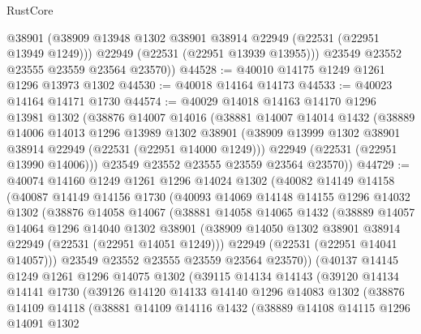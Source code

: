 \begin{lexlean}{RustCore}
\begin{coremodule}
          @38901
          (@38909 @13948 @1302 @38901 @38914 @22949 (@22531 (@22951 @13949 @1249)))
          @22949
          (@22531 (@22951 @13939 @13955)))
        @23549
        @23552
        @23555
        @23559
        @23564
        @23570))
@44528 := @40010 @14175 @1249 @1261 @1296 @13973 @1302
@44530 := @40018 @14164 @14173
@44533 := @40023 @14164 @14171 @1730
@44574 := @40029
    @14018
    @14163
    @14170
    @1296
    @13981
    @1302
    (@38876
      @14007
      @14016
      (@38881
        @14007
        @14014
        @1432
        (@38889
          @14006
          @14013
          @1296
          @13989
          @1302
          @38901
          (@38909 @13999 @1302 @38901 @38914 @22949 (@22531 (@22951 @14000 @1249)))
          @22949
          (@22531 (@22951 @13990 @14006)))
        @23549
        @23552
        @23555
        @23559
        @23564
        @23570))
@44729 := @40074
    @14160
    @1249
    @1261
    @1296
    @14024
    @1302
    (@40082
      @14149
      @14158
      (@40087
        @14149
        @14156
        @1730
        (@40093
          @14069
          @14148
          @14155
          @1296
          @14032
          @1302
          (@38876
            @14058
            @14067
            (@38881
              @14058
              @14065
              @1432
              (@38889
                @14057
                @14064
                @1296
                @14040
                @1302
                @38901
                (@38909 @14050 @1302 @38901 @38914 @22949 (@22531 (@22951 @14051 @1249)))
                @22949
                (@22531 (@22951 @14041 @14057)))
              @23549
              @23552
              @23555
              @23559
              @23564
              @23570))
          (@40137
            @14145
            @1249
            @1261
            @1296
            @14075
            @1302
            (@39115
              @14134
              @14143
              (@39120
                @14134
                @14141
                @1730
                (@39126
                  @14120
                  @14133
                  @14140
                  @1296
                  @14083
                  @1302
                  (@38876
                    @14109
                    @14118
                    (@38881
                      @14109
                      @14116
                      @1432
                      (@38889
                        @14108
                        @14115
                        @1296
                        @14091
                        @1302

\end{coremodule}
\end{lexlean}
